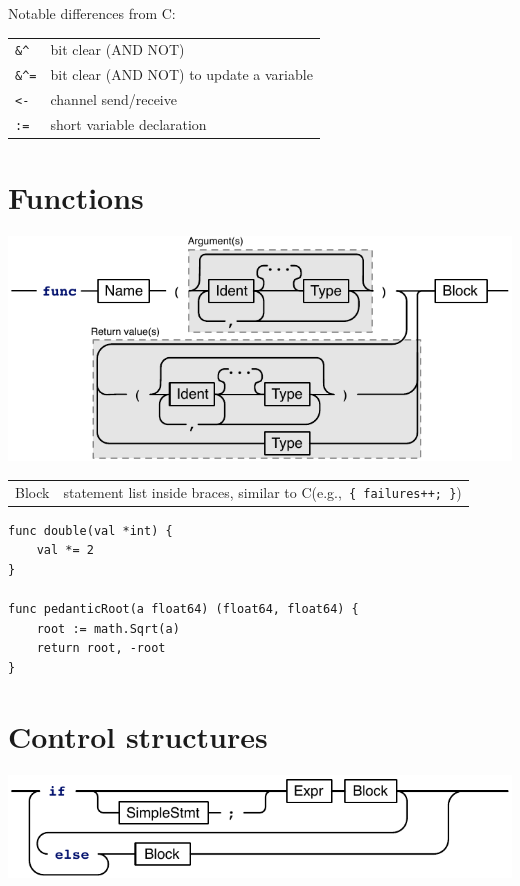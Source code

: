 \documentclass{article}
\begin{document}
\begin{multicols*}{3}
  Notable differences from C:

  \begin{tabular}{ll}
    \texttt{\&\textasciicircum} & bit clear (AND NOT) \\
    \texttt{\&\textasciicircum=} & bit clear (AND NOT) to update a variable \\
    \texttt{<-} & channel send/receive \\
    \texttt{:=} & short variable declaration     \\
  \end{tabular}

  \filbreak
  \section*{Functions}

  \includegraphics[width=\linewidth]{func}

  \begin{tabular}{p{0.3in}p{2.7in}}
    Block & statement list inside braces, similar to C\newline(e.g.,~\lstinline!{ failures++; }!)\\
  \end{tabular}

  \vspace{\baselineskip}
\begin{lstlisting}[frame=single]
func double(val *int) {
    val *= 2
}

func pedanticRoot(a float64) (float64, float64) {
    root := math.Sqrt(a)
    return root, -root
}
\end{lstlisting}

  \filbreak
  \section*{Control structures}

  \includegraphics[width=\linewidth]{if}


\end{multicols*}
\end{document}
